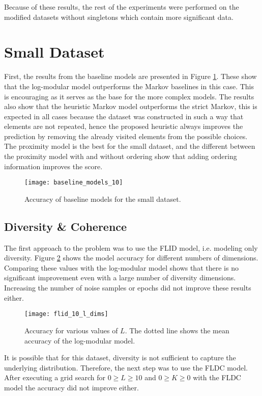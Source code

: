 Because of these results, the rest of the experiments were performed on the modified datasets without singletons which contain more significant data.

\section{Small Dataset}

First, the results from the baseline models are presented in Figure \ref{fig:small_baselines}. These show that the log-modular model outperforms the Markov baselines in this case. This is encouraging as it serves as the base for the more complex models. The results also show that the heuristic Markov model outperforms the strict Markov, this is expected in all cases because the dataset was constructed in such a way that elements are not repeated, hence the proposed heuristic always improves the prediction by removing the already visited elements from the possible choices. The proximity model is the best for the small dataset, and the different between the proximity model with and without ordering show that adding ordering information improves the score.

\begin{figure}
  \centering
  \texttt{[image: baseline\_models\_10]}
  \caption{Accuracy of baseline models for the small dataset.}
  \label{fig:small_baselines}
\end{figure}

\subsection{Diversity \& Coherence}

The first approach to the problem was to use the FLID model, i.e. modeling only diversity. Figure \ref{fig:flid_small_l_dims} shows the model accuracy for different numbers of dimensions. Comparing these values with the log-modular model shows that there is no significant improvement even with a large number of diversity dimensions. Increasing the number of noise samples or epochs did not improve these results either.

\begin{figure}
  \centering
  \texttt{[image: flid\_10\_l\_dims]}
  \caption{Accuracy for various values of $L$. The dotted line shows the mean accuracy of the log-modular model.}
  \label{fig:flid_small_l_dims}
\end{figure}

It is possible that for this dataset, diversity is not sufficient to capture the underlying distribution. Therefore, the next step was to use the FLDC model. After executing a grid search for $0 \geq L \geq 10$ and $0 \geq K \geq 0$ with the FLDC model the accuracy did not improve either.

